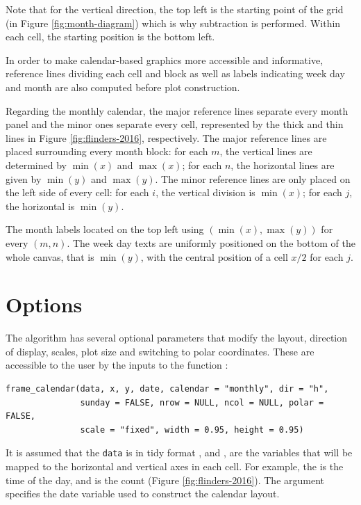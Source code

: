 \documentclass[article]{jss}
\theoremstyle{definition}
\theoremstyle{definition}
\theoremstyle{definition}
\theoremstyle{remark}
\begin{document}
Note that for the vertical direction, the top left is the starting point
of the grid (in Figure \ref{fig:month-diagram}) which is why subtraction
is performed. Within each cell, the starting position is the bottom
left.

In order to make calendar-based graphics more accessible and
informative, reference lines dividing each cell and block as well as
labels indicating week day and month are also computed before plot
construction.

Regarding the monthly calendar, the major reference lines separate every
month panel and the minor ones separate every cell, represented by the
thick and thin lines in Figure \ref{fig:flinders-2016}, respectively.
The major reference lines are placed surrounding every month block: for
each \(m\), the vertical lines are determined by \(\min{(x)}\) and
\(\max{(x)}\); for each \(n\), the horizontal lines are given by
\(\min{(y)}\) and \(\max{(y)}\). The minor reference lines are only
placed on the left side of every cell: for each \(i\), the vertical
division is \(\min{(x)}\); for each \(j\), the horizontal is
\(\min{(y)}\).

The month labels located on the top left using
\((\min{(x)}, \max{(y)})\) for every \((m, n)\). The week day texts are
uniformly positioned on the bottom of the whole canvas, that is
\(\min{(y)}\), with the central position of a cell \(x / 2\) for each
\(j\).

\section{Options}\label{options}

\label{sec:opt}

The algorithm has several optional parameters that modify the layout,
direction of display, scales, plot size and switching to polar
coordinates. These are accessible to the user by the inputs to the
function :

\newpage

\begin{verbatim}
frame_calendar(data, x, y, date, calendar = "monthly", dir = "h", 
               sunday = FALSE, nrow = NULL, ncol = NULL, polar = FALSE, 
               scale = "fixed", width = 0.95, height = 0.95)
\end{verbatim}

It is assumed that the \texttt{data} is in tidy format
\citep{wickham2014tidy}, and ,  are the variables that
will be mapped to the horizontal and vertical axes in each cell. For
example, the  is the time of the day, and  is the count
(Figure \ref{fig:flinders-2016}). The  argument specifies the
date variable used to construct the calendar layout.
\end{document}
